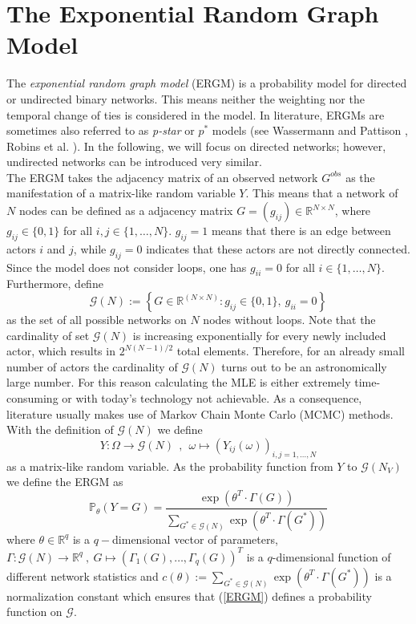 \documentclass[headsepline=true, abstracton]{scrartcl}
\begin{document}
 \section*{The Exponential Random Graph Model}
The \textit{exponential random graph model} (ERGM) is a probability model for directed or undirected binary networks. This means neither the weighting nor the temporal change of ties is considered in the model.
In literature, ERGMs are sometimes also referred to as \textit{p-star} or $p^*$ models (see Wassermann and Pattison \cite{Wasserman.1996}, Robins et al. \cite{robins.pattison.2007}). In the following, we will focus on directed networks; however, undirected networks can be introduced very similar.\\[0.3cm] 
The ERGM takes the adjacency matrix of an observed network $G^{obs}$ as the manifestation of a matrix-like random variable $Y$. This means that a network of $N$ nodes can be defined as a adjacency matrix $G=(g_{ij})\in \mathbb{R}^{N \times N}$, where $g_{ij} \in \{0,1\}$ for all $i,j \in \{1,\dots , N\}$. $g_{ij}=1$ means that there is an edge between actors $i$ and $j$, while $g_{ij}=0$ indicates that these actors are not directly connected. Since the model does not consider loops, one has $g_{ii}=0$ for all $i \in \{1,\dots , N\}$. Furthermore, define
$$ \mathcal{G}(N) := \left\{ G \in \mathbb{R}^{(N \times N)}: g_{ij} \in \{0,1\},~g_{ii}=0\right\}$$
as the set of all possible networks on $N$ nodes without loops. Note that the cardinality of set $\mathcal{G}(N)$ is increasing exponentially for every newly included actor, which results in $2^{N(N-1)/2}$ total elements. Therefore, for an already small number of actors the cardinality of $\mathcal{G}(N)$ turns out to be an astronomically large number. For this reason calculating the MLE is either extremely time-consuming or with today's technology not achievable. As a consequence, literature usually makes use of Markov Chain Monte Carlo (MCMC) methods.\\  
With the definition of $\mathcal{G}(N)$ we define 
$$Y: \Omega \to \mathcal{G}(N)~~,~~\omega \mapsto (Y_{ij}(\omega))_{i,j=1,\dots,N}$$
as a matrix-like random variable. As the probability function from $Y$ to $\mathcal{G}(N_V)$ we define the ERGM as
\begin{equation}
\mathbb{P}_{\theta}(Y=G)=\dfrac{\exp(\theta^T \cdot \Gamma(G))}{\sum_{G^* \in \mathcal{G}(N)} \exp(\theta^T \cdot \Gamma(G^*))} 
\label{ERGM}
\end{equation}
%
where $\theta \in \mathbb{R}^q$ is a $q-$dimensional vector of parameters, $\Gamma:\mathcal{G}(N) \to \mathbb{R}^q~,~G \mapsto (\Gamma_1(G),\dots,\Gamma_q(G))^T$ is a $q$-dimensional function of different network statistics and $c(\theta):= \sum_{G^* \in \mathcal{G}(N)} \exp(\theta^T \cdot \Gamma(G^*))$ is a normalization constant which ensures that (\ref{ERGM}) defines a probability function on $\mathcal{G}$.
\end{document}
